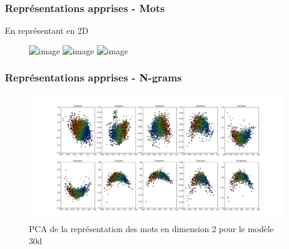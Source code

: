 \documentclass{beamer}
\begin{document}
\begin{frame}
\frametitle{Représentations apprises - Mots}
 En représentant en 2D
\begin{figure}[htp]
\centering
\includegraphics<1->[width=0.45\textwidth]{fig/WordPlot.png}
\includegraphics<2>[width=0.45\textwidth]{fig/NewModelPCA.png}
\includegraphics<3>[width=0.45\textwidth]{fig/model2d.png}
\caption{}
\end{figure}

\end{frame}

\begin{frame}
\frametitle{Représentations apprises - N-grams}
\begin{figure}[htp]
\centering
\includegraphics[scale=0.2]{fig/n_gram.png}
\caption[caption]{PCA de la représentation des mots en dimension 2 pour le modèle 30d}
\end{figure}
\end{frame}

\end{document}
